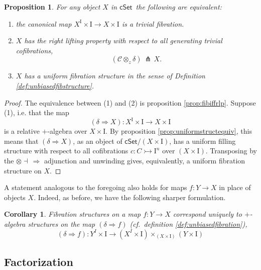 \documentclass[12pt]{article}
\newcommand{\cSet}{\ensuremath{\mathsf{cSet}}}
\newcommand{\mono}{\ensuremath{\rightarrowtail}}
\newcommand{\ra}{\ensuremath{\rightarrow}}
\newcommand{\I}{\ensuremath{\mathrm{I}}}
\newtheorem{proposition}[theorem]{Proposition}
\newtheorem{corollary}[theorem]{Corollary}
\theoremstyle{remark}
\theoremstyle{definition}
\begin{document}
\begin{proposition}\label{prop:equivfibstruc} For any object $X$ in \cSet\ the following are equivalent:
\begin{enumerate}
\item the canonical map $X^\I\times \I \ra X\times \I$ is a trivial fibration. 

\item $X$ has the right lifting property with respect to all generating trivial cofibrations,
\[
(\mathcal{C}\otimes_z\delta)\, \pitchfork\,X.
\]

\item $X$ has a uniform fibration structure in the sense of Definition \ref{def:unbiasedfibstructure}.
\end{enumerate}
\end{proposition}

\begin{proof}
The equivalence between (1) and (2) is proposition \ref{prop:fibiffrlp}.  Suppose (1), i.e. that the map
\[
(\delta\Rightarrow\!X) : X^\I\times \I \ra X\times \I
\]
is a relative $+$-algebra over $X\times \I$.  By proposition \ref{prop:uniformstructequiv}, this means that $(\delta\Rightarrow\!X)$, as an object of $\cSet/(X\times \I)$, has a uniform filling structure with respect to all cofibrations $c :C\mono \I^n$ over $(X\times \I)$.  Transposing by the $\otimes\dashv\,\Rightarrow$ adjunction and unwinding gives, equivalently, a uniform fibration structure on $X$.
\end{proof}

A statement analogous to the foregoing also holds for maps $f:Y\ra X$ in place of objects $X$.  Indeed, as before, we have the following sharper formulation.

\begin{corollary}
Fibration structures on a map $f : Y\ra X$ correspond uniquely to $+$-algebra structures on the map $(\delta\Rightarrow{f})$ (cf.\ definition \ref{def:unbiasedfibration}),
\[
(\delta\Rightarrow{f}) : Y^I\times \I \ra (X^I \times \I)\times_{(X\times \I)} (Y\times\I)
\]
\end{corollary}

\subsection{Factorization}\label{subsec:FWFS}
\end{document}

